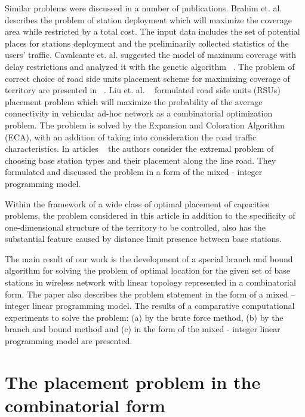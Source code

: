  	Similar problems were discussed in a number of publications. Brahim et. al. ~\cite{ref1} describes the problem of station deployment which will maximize the coverage area while restricted by a total cost. The input data includes the set of potential places for stations deployment and the preliminarily collected statistics of the users’ traffic. Cavalcante et. al. suggested the model of maximum coverage with delay restrictions and analyzed it with the genetic algorithm ~\cite{ref2}. The problem of correct choice of road side units placement scheme for maximizing coverage of territory are presented in ~\cite{ref3}. Liu et. al. ~\cite{ref4} formulated road side units (RSUs) placement problem which will maximize the probability of the average connectivity in vehicular ad-hoc network as a combinatorial optimization problem. The problem is solved by the Expansion and Coloration Algorithm (ECA), with an addition of taking into consideration the road traffic characteristics. In articles ~\cite{ref5,ref6} the authors consider the extremal problem of choosing base station types and their placement along the line road. They formulated and discussed the problem in a form of the mixed - integer programming model.
	
	Within the framework of a wide class of optimal placement of capacities problems, the problem considered in this article in addition to the specificity of one-dimensional structure of the territory to be controlled, also has the substantial feature caused by distance limit presence between base stations. 
	
	The main result of our work is the development of a special branch and bound algorithm for solving the problem of optimal location for the given set of base stations in wireless network with linear topology represented in a combinatorial form. The paper also describes  the problem statement in the form of a mixed – integer linear programming model. The results of a comparative computational experiments to solve the problem: (a) by the brute force method, (b) by the branch and bound method and (c) in the form of the mixed - integer linear programming model  are presented. 
	
\section{The placement problem in the combinatorial form}

